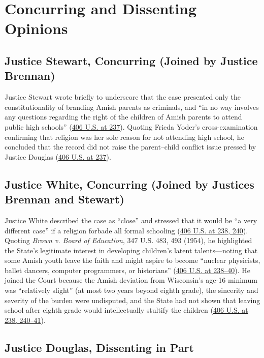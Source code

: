 \documentclass[12pt]{article}
\begin{document}
\section{Concurring and Dissenting Opinions}

\subsection{Justice Stewart, Concurring (Joined by Justice Brennan)}

Justice Stewart wrote briefly to underscore that the case presented only the constitutionality of branding Amish parents as criminals, and ``in no way involves any questions regarding the right of the children of Amish parents to attend public high schools'' (\href{https://supreme.justia.com/cases/federal/us/406/205/}{406 U.S. at 237}). Quoting Frieda Yoder's cross-examination confirming that religion was her sole reason for not attending high school, he concluded that the record did not raise the parent--child conflict issue pressed by Justice Douglas (\href{https://supreme.justia.com/cases/federal/us/406/205/}{406 U.S. at 237}).

\subsection{Justice White, Concurring (Joined by Justices Brennan and Stewart)}

Justice White described the case as ``close'' and stressed that it would be ``a very different case'' if a religion forbade all formal schooling (\href{https://supreme.justia.com/cases/federal/us/406/205/}{406 U.S. at 238, 240}). Quoting \emph{Brown v. Board of Education}, 347 U.S. 483, 493 (1954), he highlighted the State's legitimate interest in developing children's latent talents---noting that some Amish youth leave the faith and might aspire to become ``nuclear physicists, ballet dancers, computer programmers, or historians'' (\href{https://supreme.justia.com/cases/federal/us/406/205/}{406 U.S. at 238--40}). He joined the Court because the Amish deviation from Wisconsin's age-16 minimum was ``relatively slight'' (at most two years beyond eighth grade), the sincerity and severity of the burden were undisputed, and the State had not shown that leaving school after eighth grade would intellectually stultify the children (\href{https://supreme.justia.com/cases/federal/us/406/205/}{406 U.S. at 238, 240--41}).

\subsection{Justice Douglas, Dissenting in Part}
\end{document}
